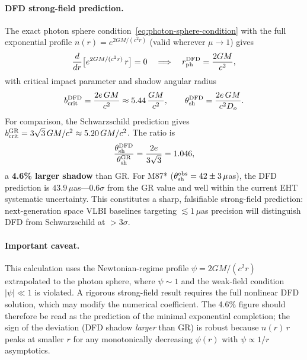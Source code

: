 \paragraph{DFD strong-field prediction.}
The exact photon sphere condition~\eqref{eq:photon-sphere-condition} with the full exponential profile $n(r) = e^{2GM/(c^2 r)}$ (valid wherever $\mu\to 1$) gives
\begin{equation}
\frac{d}{dr}\bigl[e^{2GM/(c^2r)}\,r\bigr] = 0
\quad\Longrightarrow\quad
r_{\rm ph}^{\rm DFD} = \frac{2GM}{c^2},
\end{equation}
with critical impact parameter and shadow angular radius
\begin{equation}\label{eq:shadow-dfd}
b_{\rm crit}^{\rm DFD} = \frac{2e\,GM}{c^2} \approx 5.44\,\frac{GM}{c^2},
\qquad
\theta_{\rm sh}^{\rm DFD} = \frac{2e\,GM}{c^2 D_o}.
\end{equation}
For comparison, the Schwarzschild prediction gives $b_{\rm crit}^{\rm GR} = 3\sqrt{3}\,GM/c^2 \approx 5.20\,GM/c^2$.  The ratio is
\begin{equation}\label{eq:shadow-ratio}
\frac{\theta_{\rm sh}^{\rm DFD}}{\theta_{\rm sh}^{\rm GR}} = \frac{2e}{3\sqrt{3}} = 1.046,
\end{equation}
a \textbf{4.6\% larger shadow} than GR\@.  For M87* ($\theta_{\rm sh}^{\rm obs} = 42 \pm 3\,\mu$as), the DFD prediction is $43.9\,\mu$as---$0.6\sigma$ from the GR value and well within the current EHT systematic uncertainty.  This constitutes a sharp, falsifiable strong-field prediction: next-generation space VLBI baselines targeting $\lesssim 1\,\mu$as precision will distinguish DFD from Schwarzschild at ${>}3\sigma$.

\paragraph{Important caveat.}
This calculation uses the Newtonian-regime profile $\psi = 2GM/(c^2 r)$ extrapolated to the photon sphere, where $\psi \sim 1$ and the weak-field condition $|\psi| \ll 1$ is violated.  A rigorous strong-field result requires the full nonlinear DFD solution, which may modify the numerical coefficient.  The 4.6\% figure should therefore be read as the prediction of the minimal exponential completion; the sign of the deviation (DFD shadow \emph{larger} than GR) is robust because $n(r)\,r$ peaks at smaller $r$ for any monotonically decreasing $\psi(r)$ with $\psi \propto 1/r$ asymptotics.


